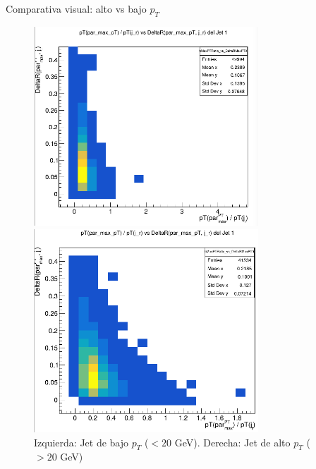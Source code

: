 \documentclass[aspectratio=43]{beamer}
\begin{document}
\begin{frame}{Comparativa visual: alto vs bajo \texorpdfstring{$p_T$}{pT}}
  \vspace{-0.5em}
  \begin{figure}
    \centering
    \begin{minipage}{0.49\textwidth}
      \centering
      \includegraphics[width=0.75\textwidth]{lowptjet.png}
    \end{minipage}
    \hfill
    \begin{minipage}{0.49\textwidth}
      \centering
      \includegraphics[width=0.75\textwidth]{higptjet.png}
    \end{minipage}
    \caption{\footnotesize Izquierda: Jet de bajo \texorpdfstring{$p_T$}{pT} ($<20$ GeV). 
    Derecha: Jet de alto \texorpdfstring{$p_T$}{pT} ($>20$ GeV)}
  \end{figure}
\end{frame}
\end{document}
